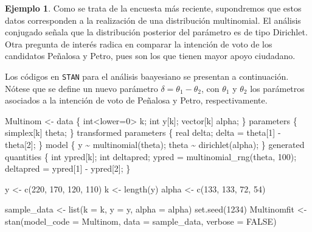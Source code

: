 \documentclass[
  10pt,
  spanish,
]{book}
\newenvironment{Shaded}{\begin{snugshade}}{\end{snugshade}}
\newcommand{\AttributeTok}[1]{\textcolor[rgb]{0.77,0.63,0.00}{#1}}
\newcommand{\ConstantTok}[1]{\textcolor[rgb]{0.00,0.00,0.00}{#1}}
\newcommand{\DecValTok}[1]{\textcolor[rgb]{0.00,0.00,0.81}{#1}}
\newcommand{\FunctionTok}[1]{\textcolor[rgb]{0.00,0.00,0.00}{#1}}
\newcommand{\NormalTok}[1]{#1}
\newcommand{\OtherTok}[1]{\textcolor[rgb]{0.56,0.35,0.01}{#1}}
\newcommand{\StringTok}[1]{\textcolor[rgb]{0.31,0.60,0.02}{#1}}
\theoremstyle{definition}
\theoremstyle{definition}
\newtheorem{example}{Ejemplo}[chapter]
\theoremstyle{definition}
\theoremstyle{definition}
\theoremstyle{remark}
\begin{document}
\begin{example}
Como se trata de la encuesta más reciente, supondremos que estos datos corresponden a la realización de una distribución multinomial. El análisis conjugado señala que la distribución posterior del parámetro es de tipo Dirichlet. Otra pregunta de interés radica en comparar la intención de voto de los candidatos Peñalosa y Petro, pues son los que tienen mayor apoyo ciudadano.

Los códigos en \texttt{STAN} para el análisis baayesiano se presentan a continuación. Nótese que se define un nuevo parámetro \(\delta=\theta_1-\theta_2\), con \(\theta_1\) y \(\theta_2\) los parámetros asociados a la intención de voto de Peñalosa y Petro, respectivamente.
\end{example}

\begin{Shaded}
\begin{Highlighting}[]
\NormalTok{Multinom }\OtherTok{\textless{}{-}} \StringTok{\textquotesingle{}}
\StringTok{data \{}
\StringTok{  int\textless{}lower=0\textgreater{} k;}
\StringTok{  int y[k];}
\StringTok{  vector[k] alpha;}
\StringTok{\}}
\StringTok{parameters \{}
\StringTok{  simplex[k] theta;}
\StringTok{\}}
\StringTok{transformed parameters \{}
\StringTok{  real delta;}
\StringTok{  delta = theta[1] {-} theta[2];}
\StringTok{\}}
\StringTok{model \{}
\StringTok{  y \textasciitilde{} multinomial(theta);}
\StringTok{  theta \textasciitilde{} dirichlet(alpha);}
\StringTok{\}}
\StringTok{generated quantities \{}
\StringTok{  int ypred[k];}
\StringTok{  int deltapred;}
\StringTok{  ypred = multinomial\_rng(theta, 100);}
\StringTok{  deltapred = ypred[1] {-} ypred[2];}
\StringTok{\}}
\StringTok{\textquotesingle{}}

\NormalTok{y }\OtherTok{\textless{}{-}} \FunctionTok{c}\NormalTok{(}\DecValTok{220}\NormalTok{, }\DecValTok{170}\NormalTok{, }\DecValTok{120}\NormalTok{, }\DecValTok{110}\NormalTok{)}
\NormalTok{k }\OtherTok{\textless{}{-}} \FunctionTok{length}\NormalTok{(y)}
\NormalTok{alpha }\OtherTok{\textless{}{-}} \FunctionTok{c}\NormalTok{(}\DecValTok{133}\NormalTok{, }\DecValTok{133}\NormalTok{, }\DecValTok{72}\NormalTok{, }\DecValTok{54}\NormalTok{)}

\NormalTok{sample\_data }\OtherTok{\textless{}{-}} \FunctionTok{list}\NormalTok{(}\AttributeTok{k =}\NormalTok{ k, }\AttributeTok{y =}\NormalTok{ y, }\AttributeTok{alpha =}\NormalTok{ alpha)}
\FunctionTok{set.seed}\NormalTok{(}\DecValTok{1234}\NormalTok{)}
\NormalTok{Multinomfit }\OtherTok{\textless{}{-}} \FunctionTok{stan}\NormalTok{(}\AttributeTok{model\_code =}\NormalTok{ Multinom,}
                   \AttributeTok{data =}\NormalTok{ sample\_data, }\AttributeTok{verbose =} \ConstantTok{FALSE}\NormalTok{)}
\end{Highlighting}
\end{Shaded}
\end{document}
